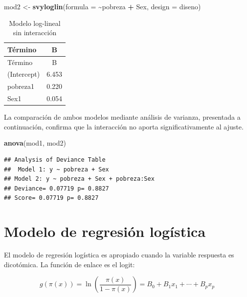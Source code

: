 \documentclass[
  spanish,
  12pt,
]{book}
\newenvironment{Shaded}{\begin{snugshade}}{\end{snugshade}}
\newcommand{\AttributeTok}[1]{\textcolor[rgb]{0.13,0.29,0.53}{#1}}
\newcommand{\FunctionTok}[1]{\textcolor[rgb]{0.13,0.29,0.53}{\textbf{#1}}}
\newcommand{\NormalTok}[1]{#1}
\newcommand{\OtherTok}[1]{\textcolor[rgb]{0.56,0.35,0.01}{#1}}
\newcommand{\SpecialCharTok}[1]{\textcolor[rgb]{0.81,0.36,0.00}{\textbf{#1}}}
\begin{document}
\begin{Shaded}
\begin{Highlighting}[]
\NormalTok{mod2 }\OtherTok{\textless{}{-}} \FunctionTok{svyloglin}\NormalTok{(}\AttributeTok{formula =} \SpecialCharTok{\textasciitilde{}}\NormalTok{pobreza }\SpecialCharTok{+}\NormalTok{ Sex,}
                  \AttributeTok{design  =}\NormalTok{ diseno)}
\end{Highlighting}
\end{Shaded}

\begin{longtable}[]{@{}lc@{}}
\caption{\label{tab:tab-loglineal-sin-interaccion}Modelo log-lineal sin interacción}\tabularnewline
\toprule\noalign{}
Término & B \\
\midrule\noalign{}
\endfirsthead
\toprule\noalign{}
Término & B \\
\midrule\noalign{}
\endhead
\bottomrule\noalign{}
\endlastfoot
(Intercept) & 6.453 \\
pobreza1 & 0.220 \\
Sex1 & 0.054 \\
\end{longtable}

La comparación de ambos modelos mediante análisis de varianza, presentada a continuación, confirma que la interacción no aporta significativamente al ajuste.

\begin{Shaded}
\begin{Highlighting}[]
\FunctionTok{anova}\NormalTok{(mod1, mod2)}
\end{Highlighting}
\end{Shaded}

\begin{verbatim}
## Analysis of Deviance Table
##  Model 1: y ~ pobreza + Sex
## Model 2: y ~ pobreza + Sex + pobreza:Sex 
## Deviance= 0.07719 p= 0.8827 
## Score= 0.07719 p= 0.8827
\end{verbatim}

\section{Modelo de regresión logística}\label{sec-logistica}

El modelo de regresión logística es apropiado cuando la variable respuesta es dicotómica. La función de enlace es el logit:

\[
g(\pi(x)) = \ln\left(\frac{\pi(x)}{1-\pi(x)}\right) = B_0 + B_1 x_1 + \cdots + B_p x_p
\]
\end{document}
